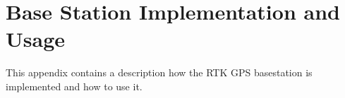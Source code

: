 \chapter{Base Station Implementation and Usage}\label{app:rtk_gps}
This appendix contains a description how the RTK GPS basestation is implemented and how to use it.



